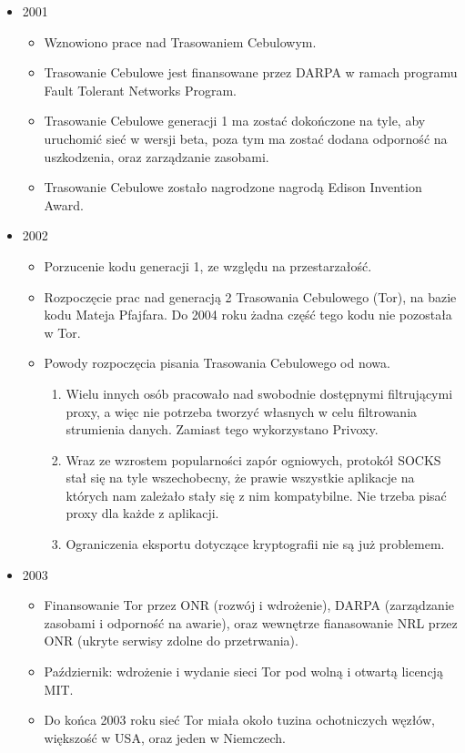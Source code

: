 \begin{itemize}
  \item 2001
  \begin{itemize}
   \item Wznowiono prace nad Trasowaniem Cebulowym.
   \item Trasowanie Cebulowe jest finansowane przez DARPA w ramach programu Fault Tolerant Networks Program.
   \item Trasowanie Cebulowe generacji 1 ma zostać dokończone na tyle, aby uruchomić sieć w wersji beta, poza tym ma zostać dodana odporność na uszkodzenia, oraz zarządzanie zasobami.
   \item Trasowanie Cebulowe zostało nagrodzone nagrodą Edison Invention Award.
  \end{itemize}
  
  \item 2002
  \begin{itemize}
   \item Porzucenie kodu generacji 1, ze względu na przestarzałość.
   \item Rozpoczęcie prac nad generacją 2 Trasowania Cebulowego (Tor), na bazie kodu Mateja Pfajfara. Do 2004 roku żadna część tego kodu nie pozostała w Tor.
   \item Powody rozpoczęcia pisania Trasowania Cebulowego od nowa.
   \begin{enumerate}
    \item Wielu innych osób pracowało nad swobodnie dostępnymi filtrującymi proxy, a więc nie potrzeba tworzyć własnych w celu filtrowania strumienia danych. Zamiast tego wykorzystano Privoxy.
    \item Wraz ze wzrostem popularności zapór ogniowych, protokół SOCKS stał się na tyle wszechobecny, że prawie wszystkie aplikacje na których nam zależało stały się z nim kompatybilne. Nie trzeba pisać proxy dla każde z aplikacji.
    \item Ograniczenia eksportu dotyczące kryptografii nie są już problemem.
   \end{enumerate}
  \end{itemize}
  
  \item 2003
  \begin{itemize}
   \item Finansowanie Tor przez ONR (rozwój i wdrożenie), DARPA (zarządzanie zasobami i odporność na awarie), oraz wewnętrze fianasowanie NRL przez ONR (ukryte serwisy zdolne do przetrwania).
   \item Październik: wdrożenie i wydanie sieci Tor pod wolną i otwartą licencją MIT.
   \item Do końca 2003 roku sieć Tor miała około tuzina ochotniczych węzłów, większość w USA, oraz jeden w Niemczech.
  \end{itemize}


\end{itemize}
